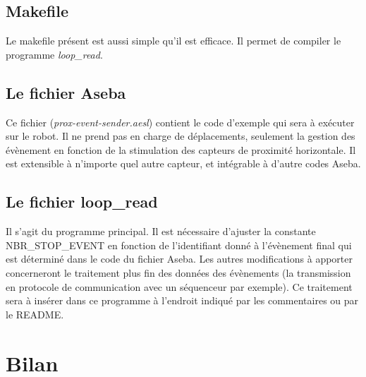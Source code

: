 \documentclass[a4paper, 12pt]{report}
\begin{document}
\section{Makefile}
Le makefile présent est aussi simple qu'il est efficace. Il permet de compiler le programme \textit{loop\_read}.

\section{Le fichier Aseba}
Ce fichier (\textit{prox-event-sender.aesl}) contient le code d'exemple qui sera à exécuter sur le robot. Il ne prend pas en charge de déplacements, seulement la gestion des évènement en fonction de la stimulation des capteurs de proximité horizontale. Il est extensible à n'importe quel autre capteur, et intégrable à d'autre codes Aseba.

\section{Le fichier loop\_read}
Il s'agit du programme principal. Il est nécessaire d'ajuster la constante \\NBR\_STOP\_EVENT en fonction de l'identifiant donné à l'évènement final qui est déterminé dans le code du fichier Aseba. Les autres modifications à apporter concerneront le traitement plus fin des données des évènements (la transmission en protocole de communication avec un séquenceur par exemple). Ce traitement sera à insérer dans ce programme à l'endroit indiqué par les commentaires ou par le README.

\chapter{Bilan}
\end{document}
